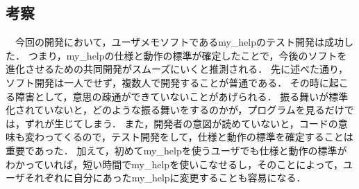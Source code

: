 \subsection{考察}
　今回の開発において，ユーザメモソフトであるmy\_helpのテスト開発は成功した．
つまり，my\_helpの仕様と動作の標準が確定したことで，今後のソフトを進化させるための共同開発がスムーズにいくと推測される．
先に述べた通り，ソフト開発は一人でせず，複数人で開発することが普通である．
その時に起こる障害として，意思の疎通ができていないことがあげられる．
振る舞いが標準化されていないと，どのような振る舞いをするのかが，プログラムを見るだけでは，ずれが生じてしまう．
また，開発者の意図が読めていないと，コードの意味も変わってくるので，テスト開発をして，仕様と動作の標準を確定することは重要であった．
加えて，初めてmy\_helpを使うユーザでも仕様と動作の標準がわかっていれば，短い時間でmy\_helpを使いこなせるし，そのことによって，ユーザそれぞれに自分にあったmy\_helpに変更することも容易になる．

